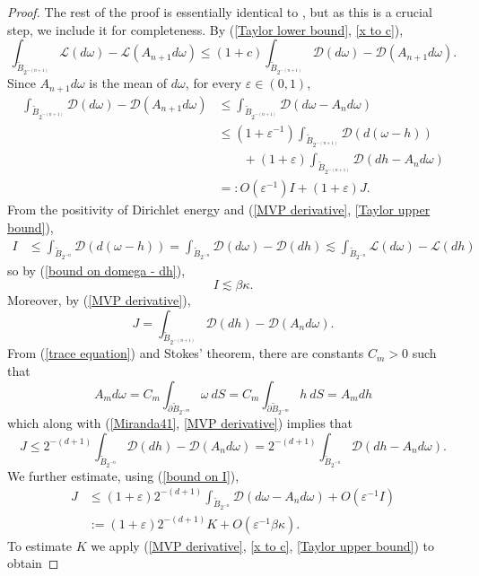 \documentclass[reqno,12pt,letterpaper]{amsart}
\newcommand{\Lagrange}{\mathscr L}
\newcommand{\DirL}{\mathscr D}
\theoremstyle{definition}
\numberwithin{equation}{section}
\begin{document}
\begin{proof}
The rest of the proof is essentially identical to \cite[Lemma 4.2]{Miranda66}, but as this is a crucial step, we include it for completeness.
By (\ref{Taylor lower bound}, \ref{x to c}),
$$\int_{\tilde B_{2^{-(n + 1)}}} \Lagrange(d\omega) - \Lagrange(A_{n + 1}d\omega) \leq (1 + c)\int_{\tilde B_{2^{-(n + 1)}}} \DirL(d\omega) - \DirL(A_{n + 1}d\omega).$$
Since $A_{n + 1}d\omega$ is the mean of $d\omega$, for every $\varepsilon \in (0, 1)$,
\begin{align*}
\int_{\tilde B_{2^{-(n + 1)}}} \DirL(d\omega) - \DirL(A_{n + 1}d\omega)
&\leq \int_{\tilde B_{2^{-(n + 1)}}} \DirL(d\omega - A_nd\omega) \\
&\leq (1 + \varepsilon^{-1}) \int_{\tilde B_{2^{-(n + 1)}}} \DirL(d(\omega - h)) \\
&\qquad +(1 + \varepsilon) \int_{\tilde B_{2^{-(n + 1)}}} \DirL(dh - A_nd\omega) \\
&=: O(\varepsilon^{-1}) I + (1 + \varepsilon) J.
\end{align*}
From the positivity of Dirichlet energy and (\ref{MVP derivative}, \ref{Taylor upper bound}),
\begin{align*}
I &\leq \int_{\tilde B_{2^{-n}}} \DirL(d(\omega - h)) = \int_{\tilde B_{2^{-n}}} \DirL(d\omega) - \DirL(dh) \lesssim \int_{\tilde B_{2^{-n}}} \Lagrange(d\omega) - \Lagrange(dh)
\end{align*}
so by (\ref{bound on domega - dh}),
\begin{equation}\label{bound on I}
I \lesssim \beta\kappa.
\end{equation}
Moreover, by (\ref{MVP derivative}),
$$J = \int_{\tilde B_{2^{-(n + 1)}}} \DirL(dh) - \DirL(A_nd\omega).$$
From (\ref{trace equation}) and Stokes' theorem, there are constants $C_m > 0$ such that
$$A_m d\omega = C_m \int_{\partial \tilde B_{2^{-m}}} \omega ~dS = C_m \int_{\partial \tilde B_{2^{-m}}} h ~dS = A_m dh$$
which along with (\ref{Miranda41}, \ref{MVP derivative}) implies that
$$J \leq 2^{-(d + 1)} \int_{\tilde B_{2^{-n}}} \DirL(dh) - \DirL(A_nd\omega) = 2^{-(d + 1)} \int_{\tilde B_{2^{-n}}} \DirL(dh - A_n d\omega).$$
We further estimate, using (\ref{bound on I}),
\begin{align*}
J &\leq (1 + \varepsilon) 2^{-(d + 1)} \int_{\tilde B_{2^{-n}}} \DirL(d\omega - A_n d\omega) + O(\varepsilon^{-1} I) \\
&:= (1 + \varepsilon) 2^{-(d + 1)} K + O(\varepsilon^{-1} \beta \kappa).
\end{align*}
To estimate $K$ we apply (\ref{MVP derivative}, \ref{x to c}, \ref{Taylor upper bound}) to obtain

\end{proof}
\end{document}
